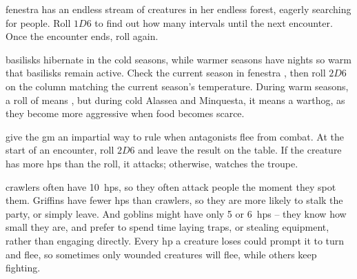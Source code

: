 \begin{multicols}{2}
\begin{figure*}[b!]
\begin{multicols}{3}
\end{multicols}

\end{figure*}

\noindent
\Gls{fenestra} has an endless stream of creatures in her endless forest, eagerly searching for people.
Roll $1D6$ to find out how many \glspl{interval} until the next encounter.
Once the encounter ends, roll again.

\Glspl{basilisk} hibernate in the cold seasons, while warmer seasons have nights so warm that \glspl{basilisk} remain active.
Check the current season in \gls{fenestra} , then roll $2D6$ on the column matching the current season's temperature.
During warm seasons, a roll of   means , but during cold \gls{Alassea} and \gls{Minquesta}, it means a warthog, as they become more aggressive when food becomes scarce.

\forestEncChart

give the \gls{gm} an impartial way to rule when antagonists flee from combat.
At the start of an encounter, roll $2D6$ and leave the result on the table.
If the creature has more \glspl{hp} than the roll, it attacks; otherwise, watches the troupe.


\Glspl{crawler} often have 10~\glspl{hp}, so they often attack people the moment they spot them.
Griffins have fewer \glspl{hp} than \glspl{crawler}, so they are more likely to stalk the party, or simply leave.
And goblins might have only 5 or 6~\glspl{hp} -- they know how small they are, and prefer to spend time laying traps, or stealing equipment, rather than engaging directly.
Every \gls{hp} a creature loses could prompt it to turn and flee, so sometimes only wounded creatures will flee, while others keep fighting.


\end{multicols}
